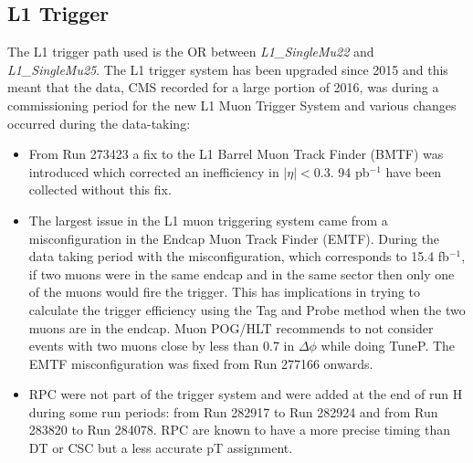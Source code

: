 \subsection{L1 Trigger}
The L1 trigger path used is the OR between \textit{L1\_SingleMu22} and \textit{L1\_SingleMu25}. 
The L1 trigger system has been upgraded since 2015 and this meant that the data, CMS recorded for a large portion of 2016, was during a commissioning period for the new L1 Muon Trigger System and various changes occurred during the data-taking:
\begin{itemize}
\item From Run 273423 a fix to the L1 Barrel Muon Track Finder (BMTF) was introduced which corrected an inefficiency in $\lvert \eta \lvert<0.3$. 94 pb$^{-1} $ have been collected without this fix.
\item The largest issue in the L1 muon triggering system came from a misconfiguration in the Endcap Muon Track Finder (EMTF).
During the data taking period with the misconfiguration, which corresponds to 15.4 fb$^{-1} $, if two muons were in the same endcap and in the same sector then only one of the muons would fire the trigger. This has implications in trying to calculate the trigger efficiency using the Tag and Probe method when the two muons are in the endcap.
Muon POG/HLT recommends to not consider events with two muons close by less than 0.7 in $\Delta \phi$ while doing TuneP. The EMTF misconfiguration was fixed from Run 277166 onwards.
\item RPC were not part of the trigger system and were added at the end of run H during some run periods: from Run 282917 to Run 282924 and from Run 283820 to Run 284078. RPC are known to have a more precise timing than DT or CSC but a less accurate pT assignment.
\end{itemize}
